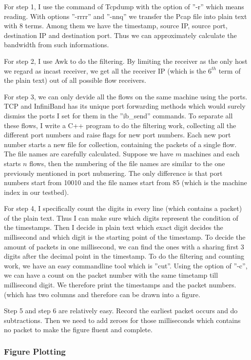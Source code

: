 \documentclass[12pt,a4paper]{article}
\begin{document}
For step 1, I use the command of Tcpdump with the option of ''-r'' which means reading.
With options ''-rrrr'' and ''-nnq'' we transfer the Pcap file into plain text with 8 terms.
Among them we have the timestamp, source IP, source port, destination IP and destination port.
Thus we can approximately calculate the bandwidth from such informations.

For step 2, I use Awk to do the filtering. By limiting the receiver as the only host we regard as incast receiver, we get all the receiver IP (which is the
$6^{th}$ term of the plain text) out of all possible flow receivers.

For step 3, we can only devide all the flows on the same machine using the ports.
TCP and InfiniBand has its unique port forwarding methods which would surely dismiss the ports I set for them in the ''ib\_send'' commands.
To separate all these flows, I write a C++ program to do the filtering work, collecting all the different port numbers and raise flags for new port numbers.
Each new port number starts a new file for collection, containing the packets of a single flow.
The file names are carefully calculated.
Suppose we have $m$ machines and each starts $n$ flows, then the numbering of the file names are similar to the one previously mentioned in port nubmering.
The only difference is that port numbers start from 10010 and the file names start from 85 (which is the machine index in our testbed).

For step 4, I specifically count the digits in every line (which contains a packet) of the plain text. Thus I can make sure which digits represent the condition
of the timestamps. 
Then I decide in plain text which exact digit decides the millisecond and which digit is the starting point of the timestamp.
To decide the amount of packets in one millisecond, we can find the ones with a sharing first 3 digits after the decimal point in the timestamp.
To do the filtering and counting work, we have an easy commandline tool which is ''cut''.
Using the option of ''-c'', we can have a count on the packet number with the same timetamp till millisecond digit.
We therefore print the timestamps and the packet numbers. (which has two columns and therefore can be drawn into a figure.

Step 5 and step 6 are relatively easy. 
Record the earliest packet occurs and do subtractions.
Then we need to add zeroes for those milliseconds which contains no packet to make the figure fluent and complete.

\subsubsection{Figure Plotting}
\end{document}
